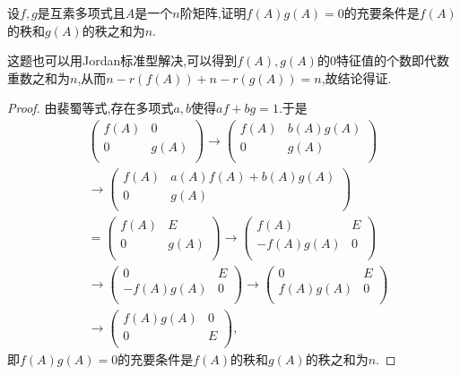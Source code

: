 \documentclass[../../main.tex]{subfiles}
\begin{document}
\begin{example}
设\( f,g \)是互素多项式且\( A \)是一个\( n \)阶矩阵,证明\( f(A)g(A)=0 \)的充要条件是\( f(A) \)的秩和\( g(A) \)的秩之和为\( n \).
\end{example}
\begin{note}
这题也可以用Jordan标准型解决,可以得到$f(A),g(A)$的0特征值的个数即代数重数之和为$n$,从而$n-r(f(A))+n-r(g(A))=n$,故结论得证.
\end{note}
\begin{proof}
由裴蜀等式,存在多项式\( a,b \)使得\( af + bg = 1 \).于是
\begin{align*}
&\left( \begin{matrix}
f(A)&		0\\
0&		g(A)\\
\end{matrix} \right) \rightarrow \left( \begin{matrix}
f(A)&		b(A)g(A)\\
0&		g(A)\\
\end{matrix} \right) 
\\
&\rightarrow \left( \begin{matrix}
f(A)&		a(A)f(A)+b(A)g(A)\\
0&		g(A)\\
\end{matrix} \right) 
\\
&=\left( \begin{matrix}
f(A)&		E\\
0&		g(A)\\
\end{matrix} \right) \rightarrow \left( \begin{matrix}
f(A)&		E\\
-f(A)g(A)&		0\\
\end{matrix} \right) 
\\
&\rightarrow \left( \begin{matrix}
0&		E\\
-f(A)g(A)&		0\\
\end{matrix} \right) \rightarrow \left( \begin{matrix}
0&		E\\
f(A)g(A)&		0\\
\end{matrix} \right) 
\\
&\rightarrow \left( \begin{matrix}
f(A)g(A)&		0\\
0&		E\\
\end{matrix} \right) ,
\end{align*}
即\( f(A)g(A)=0 \)的充要条件是\( f(A) \)的秩和\( g(A) \)的秩之和为\( n \).

\end{proof}
\end{document}
